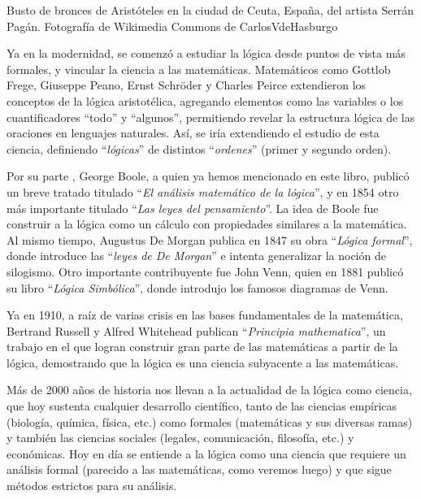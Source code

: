 {Busto de bronces de Aristóteles en la ciudad de Ceuta, España, del artista
Serrán Pagán.} {Fotografía de Wikimedia Commons de CarlosVdeHasburgo}

Ya en la modernidad, se comenzó a estudiar la lógica desde puntos de vista más
formales, y vincular la ciencia a las matemáticas. Matemáticos como Gottlob
Frege, Giuseppe Peano, Ernst
Schröder y Charles Peirce extendieron los conceptos de la lógica aristotélica, agregando
elementos como las variables o los cuantificadores ``todo'' y ``algunos'',
permitiendo revelar la estructura lógica de las oraciones en lenguajes
naturales. Así, se iría extendiendo el estudio de esta ciencia, definiendo
``\textit{lógicas}'' de distintos ``\textit{ordenes}'' (primer y segundo orden).

Por su parte , George Boole, a quien ya hemos mencionado en
este libro, publicó un breve tratado titulado ``\textit{El análisis matemático
de la lógica}'', y en 1854 otro más importante titulado ``\textit{Las leyes del
pensamiento}''. La idea de Boole fue construir a la lógica como un cálculo con
propiedades similares a la matemática. Al mismo tiempo, Augustus De
Morgan publica en 1847 su obra ``\textit{Lógica
formal}'', donde introduce las ``\textit{leyes de De Morgan}'' e intenta
generalizar la noción de silogismo. Otro importante contribuyente fue John Venn,
quien en 1881 publicó su libro ``\textit{Lógica Simbólica}'', donde introdujo
los famosos diagramas de Venn.

Ya en 1910, a raíz de varias crisis en las bases fundamentales de la matemática,
Bertrand Russell y Alfred Whitehead publican ``\textit{Principia mathematica}'', un trabajo en el que logran construir gran parte de las
matemáticas a partir de la lógica, demostrando que la lógica es una ciencia
subyacente a las matemáticas.

Más de 2000 años de historia nos llevan a la actualidad de la lógica como
ciencia, que hoy sustenta cualquier desarrollo científico, tanto de las ciencias
empíricas (biología, química, física, etc.) como formales (matemáticas y sus
diversas ramas) y también las ciencias sociales (legales, comunicación,
filosofía, etc.) y económicas. Hoy en día se entiende a la lógica como una
ciencia que requiere un análisis formal (parecido a las matemáticas, como
veremos luego) y que sigue métodos estrictos para su análisis.

